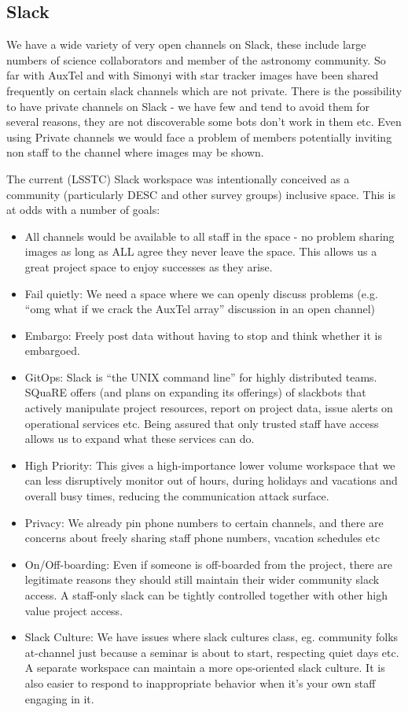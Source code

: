 \subsection{Slack} \label{sec:slack}

We have a wide variety of very open channels on Slack, these include large numbers of science collaborators and member of the astronomy community.
So far with AuxTel and with Simonyi with star tracker images have been shared frequently on certain slack channels which are not private.
There is the possibility to have private channels on Slack - we have few and tend to avoid them for several reasons, they are not discoverable some bots don't work in them etc.
Even using Private channels we would face a problem of members potentially inviting non staff to the channel where images may be shown.


The current (LSSTC) Slack workspace was intentionally conceived as a community (particularly DESC and other survey groups) inclusive space. This is at odds with a number of goals:

\begin{itemize}
\item  All channels would be available to all staff in the space - no problem sharing images as long as ALL agree they never leave the space.
This allows us a great project space to enjoy successes as they arise.
\item  Fail quietly: We need a space where we can openly discuss problems (e.g. “omg what if we crack the AuxTel array” discussion in an open channel)
\item Embargo: Freely post data without having to stop and think whether it is embargoed.
\item GitOps: Slack is “the UNIX command line” for highly distributed teams. SQuaRE offers (and plans on expanding its offerings) of slackbots that actively manipulate project resources, report on project data, issue alerts on operational services etc. Being assured that only trusted staff have access allows us to expand what these services can do.
\item High Priority:  This gives a high-importance lower volume workspace that we can less disruptively monitor out of hours, during holidays and vacations and overall busy times, reducing the communication attack surface.
\item Privacy: We already pin phone numbers to certain channels, and there are concerns about freely sharing staff phone numbers, vacation schedules etc
\item On/Off-boarding: Even if someone is off-boarded from the project, there are legitimate reasons they should still maintain their wider community slack access. A staff-only slack can be tightly controlled together with other high value project access.
\item Slack Culture: We have issues where slack cultures class, eg. community folks at-channel just because a seminar is about to start, respecting quiet days etc. A separate workspace can maintain a more ops-oriented slack culture. It is also easier to respond to inappropriate behavior when it’s your own staff engaging in it.
\end{itemize}

